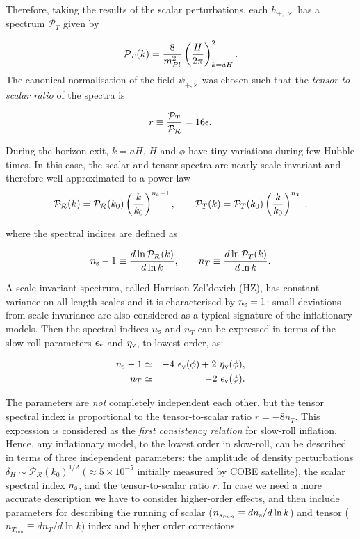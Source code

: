\documentclass{rmaa}
\def\beq{\begin{equation}}
\def\eeq{\end{equation}}
\def\bea{\begin{eqnarray}}
\def\eea{\end{eqnarray}}
\def\cal{\mathcal}
\begin{document}
\noindent
Therefore, taking the results of the scalar perturbations, each $h_{+,\, \times}$ has a spectrum $\cal P_T$ given by

\beq
\cal P_{T}(k)={8 \over m_{Pl}^2} \left({H \over 2\pi} \right)_{k=aH}^2.
\eeq
%
The canonical normalisation of the field $\psi_{+,\times}$ was chosen such that
the \textit{tensor-to-scalar ratio} of the spectra is  

\begin{equation}
r \equiv {\cal P_{T} \over \cal P_{\cal R}} =16 \epsilon .
\end{equation}

During the horizon exit, $k=aH$, $H$ and $\dot \phi$ have
tiny variations during few Hubble times. In this case, the scalar and tensor 
spectra are nearly scale invariant and therefore well approximated to a power law 
%
\bea \label{eq:spectra}
\cal P_\cal R(k)  =\cal P_\cal R(k_0) \left( \frac{k}{k_0} \right)^{n_{\rm s}-1},\qquad %
\cal P_T(k)  = \cal P_T(k_0) \left( \frac{k}{k_0} \right)^{n_T} \, .
\eea

\noindent
where the spectral indices are defined as 

\beq
n_{\rm s}-1\equiv {d\ln \cal P_\cal R(k) \over d\ln k},\qquad
n_T \equiv {d\ln \cal P_T(k) \over d\ln k}. 
\eeq

\noindent
A scale-invariant spectrum, called Harrison-Zel'dovich (HZ), has constant variance
on all length scales and it is characterised by $n_{\rm s}= 1$:
small deviations from scale-invariance are also considered as a typical signature of the
inflationary models. 
Then the spectral indices $n_{\rm s}$ and $n_{T}$ can be expressed 
 in terms of the slow-roll parameters $\epsilon_{\rm v}$ and $\eta_{\rm v}$, to lowest order, as:

\bea \label{indices}
n_{\rm s} - 1  &\simeq&  - 4~ \epsilon_{\rm v}(\phi) + 2~ \eta_{\rm v}(\phi), \nonumber \\
n_T  &\simeq&  -2~ \epsilon_{\rm v}(\phi). 
\eea

\noindent
The parameters are {\em not} completely independent each other,  but the tensor spectral 
index is proportional to the tensor-to-scalar ratio
$r = -8 n_{T}  $.  This expression is considered as the \textit{first consistency
relation} for slow-roll inflation.  
Hence, any inflationary model, to the lowest order in slow-roll, 
can be described in terms of three independent parameters:
 the amplitude of density perturbations
 $\delta_H \sim \cal P_\cal R(k_0)^{1/2}$ ($\approx 5 \times 10^{-5}$ initially measured by COBE satellite), 
 the scalar spectral index $n_{\rm s}$, and the tensor-to-scalar ratio $r$.
In case we need a more accurate description we have to consider higher-order effects, 
and then include parameters for describing the running of scalar ($n_{s_{run}} \equiv d n_{\rm s} / d\ln{k}$)
and tensor ($n_{T_{run}} \equiv  d n_T / d\ln{k}$) index and higher order corrections. 
\\
\end{document}
